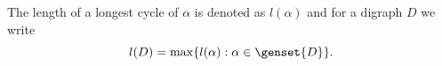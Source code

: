 The length of a longest cycle of $\alpha$ is denoted as $l(\alpha)$ and for a
digraph $D$ we write
\[l(D) = \max \{ l(\alpha) : \alpha \in \genset{D} \}.\]